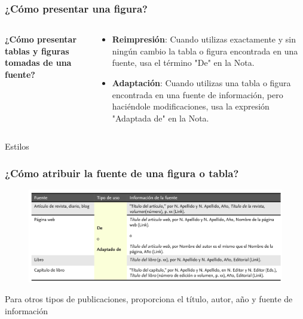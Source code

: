 \documentclass[
11pt, %
]{beamer}
\begin{document}
\begin{frame}
	\frametitle{¿Cómo presentar una figura?}

	\begin{columns}[c] %
		\begin{column}{0.5\textwidth} %
			\textbf{¿Cómo presentar tablas y figuras tomadas de una fuente?}
		\end{column}
		\begin{column}{0.5\textwidth} %
			\begin{itemize}
				\item \textbf{Reimpresión}: Cuando utilizas exactamente y sin ningún cambio la tabla o figura encontrada en una fuente, usa el término "De" en la Nota.
				\item \textbf{Adaptación}: Cuando utilizas una tabla o figura encontrada en una fuente de información, pero haciéndole modificaciones, usa la expresión "Adaptada de" en la Nota.
			\end{itemize}

		\end{column}
	\end{columns}

\end{frame}

\begin{frame}{Estilos}
	\frametitle{¿Cómo atribuir la fuente de una figura o tabla?}
	\begin{figure}
		\centering
		\includegraphics[width=1\linewidth]{images/screenshot006}
	\end{figure}

	Para otros tipos de publicaciones, proporciona el título, autor, año y fuente
	de información

\end{frame}
\end{document}
